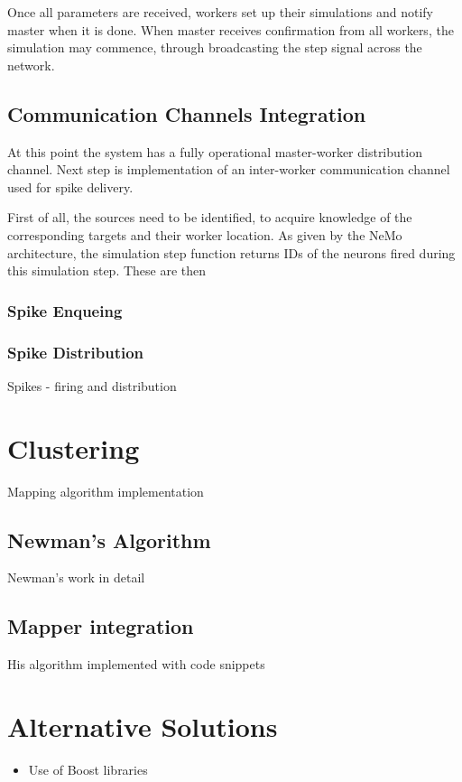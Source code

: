 Once all parameters are received, workers set up their simulations and notify master when it is done. When master receives confirmation from all workers, the simulation may commence, through broadcasting the step signal across the network. 

\subsection{Communication Channels Integration}

At this point the system has a fully operational master-worker distribution channel. Next step is implementation of an inter-worker communication channel used for spike delivery.

First of all, the sources need to be identified, to acquire knowledge of the corresponding targets and their worker location. As given by the NeMo architecture, the simulation step function returns IDs of the neurons fired during this simulation step. These are then


\subsubsection{Spike Enqueing}



\subsubsection{Spike Distribution}

Spikes - firing and distribution

\section{Clustering}

Mapping algorithm implementation

\subsection{Newman's Algorithm}

Newman's work in detail

\subsection{Mapper integration}

His algorithm implemented with code snippets

\section{Alternative Solutions}

\begin{itemize}
\item{Use of Boost libraries}
\end{itemize}
